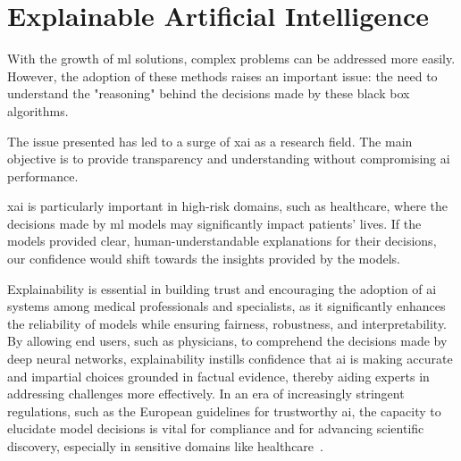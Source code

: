 

\section{Explainable Artificial Intelligence}

With the growth of \ac{ml} solutions, complex problems can be addressed more easily. However, the adoption of these methods raises an important issue: the need to understand the "reasoning" behind the decisions made by these black box algorithms.

The issue presented has led to a surge of \acf{xai} as a research field. The main objective is to provide transparency and understanding without compromising \ac{ai} performance.

\ac{xai} is particularly important in high-risk domains, such as healthcare, where the decisions made by \ac{ml} models may significantly impact patients' lives.
If the models provided clear, human-understandable explanations for their decisions, our confidence would shift towards the insights provided by the models.

Explainability is essential in building trust and encouraging the adoption of \ac{ai} systems among medical professionals and specialists, as it significantly enhances the reliability of models while ensuring fairness, robustness, and interpretability. By allowing end users, such as physicians, to comprehend the decisions made by deep neural networks, explainability instills confidence that \ac{ai} is making accurate and impartial choices grounded in factual evidence, thereby aiding experts in addressing challenges more effectively. In an era of increasingly stringent regulations, such as the European guidelines for trustworthy \ac{ai}, the capacity to elucidate model decisions is vital for compliance and for advancing scientific discovery, especially in sensitive domains like healthcare~\cite{ali_explainable_2023}. 

